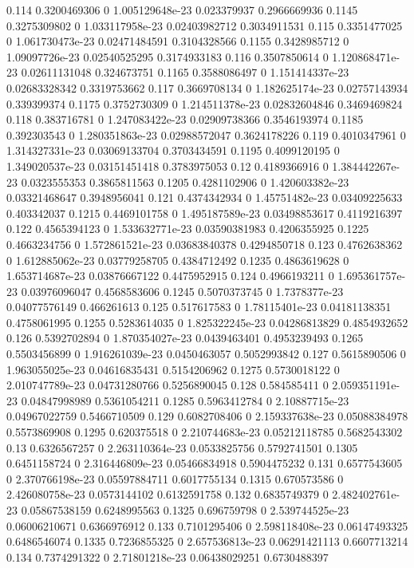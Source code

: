 {0.114 0.3200469306 0 1.005129648e-23 0.023379937 0.2966669936
0.1145 0.3275309802 0 1.033117958e-23 0.02403982712 0.3034911531
0.115 0.3351477025 0 1.061730473e-23 0.02471484591 0.3104328566
0.1155 0.3428985712 0 1.09097726e-23 0.02540525295 0.3174933183
0.116 0.3507850614 0 1.120868471e-23 0.02611131048 0.324673751
0.1165 0.3588086497 0 1.151414337e-23 0.02683328342 0.3319753662
0.117 0.3669708134 0 1.182625174e-23 0.02757143934 0.339399374
0.1175 0.3752730309 0 1.214511378e-23 0.02832604846 0.3469469824
0.118 0.383716781 0 1.247083422e-23 0.02909738366 0.3546193974
0.1185 0.392303543 0 1.280351863e-23 0.02988572047 0.3624178226
0.119 0.4010347961 0 1.314327331e-23 0.03069133704 0.3703434591
0.1195 0.4099120195 0 1.349020537e-23 0.03151451418 0.3783975053
0.12 0.4189366916 0 1.384442267e-23 0.0323555353 0.3865811563
0.1205 0.4281102906 0 1.420603382e-23 0.03321468647 0.3948956041
0.121 0.4374342934 0 1.45751482e-23 0.03409225633 0.403342037
0.1215 0.4469101758 0 1.495187589e-23 0.03498853617 0.4119216397
0.122 0.4565394123 0 1.533632771e-23 0.03590381983 0.4206355925
0.1225 0.4663234756 0 1.572861521e-23 0.03683840378 0.4294850718
0.123 0.4762638362 0 1.612885062e-23 0.03779258705 0.4384712492
0.1235 0.4863619628 0 1.653714687e-23 0.03876667122 0.4475952915
0.124 0.4966193211 0 1.695361757e-23 0.03976096047 0.4568583606
0.1245 0.5070373745 0 1.7378377e-23 0.04077576149 0.466261613
0.125 0.517617583 0 1.78115401e-23 0.04181138351 0.4758061995
0.1255 0.5283614035 0 1.825322245e-23 0.04286813829 0.4854932652
0.126 0.5392702894 0 1.870354027e-23 0.0439463401 0.4953239493
0.1265 0.5503456899 0 1.916261039e-23 0.0450463057 0.5052993842
0.127 0.5615890506 0 1.963055025e-23 0.04616835431 0.5154206962
0.1275 0.5730018122 0 2.010747789e-23 0.04731280766 0.5256890045
0.128 0.584585411 0 2.059351191e-23 0.04847998989 0.5361054211
0.1285 0.5963412784 0 2.10887715e-23 0.04967022759 0.5466710509
0.129 0.6082708406 0 2.159337638e-23 0.05088384978 0.5573869908
0.1295 0.620375518 0 2.210744683e-23 0.05212118785 0.5682543302
0.13 0.6326567257 0 2.263110364e-23 0.0533825756 0.5792741501
0.1305 0.6451158724 0 2.316446809e-23 0.05466834918 0.5904475232
0.131 0.6577543605 0 2.370766198e-23 0.05597884711 0.6017755134
0.1315 0.670573586 0 2.426080758e-23 0.0573144102 0.6132591758
0.132 0.6835749379 0 2.482402761e-23 0.05867538159 0.6248995563
0.1325 0.696759798 0 2.539744525e-23 0.06006210671 0.6366976912
0.133 0.7101295406 0 2.598118408e-23 0.06147493325 0.6486546074
0.1335 0.7236855325 0 2.657536813e-23 0.06291421113 0.6607713214
0.134 0.7374291322 0 2.71801218e-23 0.06438029251 0.6730488397
}
